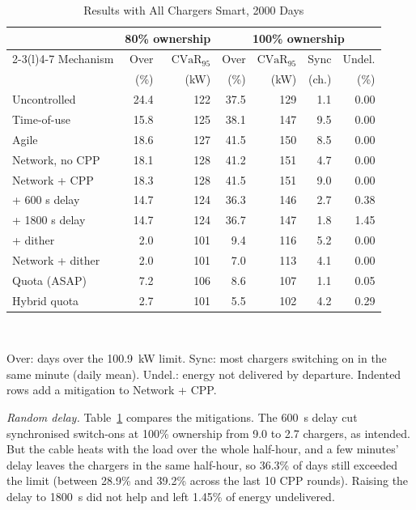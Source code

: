 \documentclass[conference]{IEEEtran}
\newcommand{\CVaR}{\mathrm{CVaR}}
\begin{document}
\begin{table}[t]
\caption{Results with All Chargers Smart, 2000 Days}
\label{tab:main}
\centering
\footnotesize
\setlength{\tabcolsep}{2.4pt}
\begin{tabular}{@{}lrrrrrr@{}}
\toprule
 & \multicolumn{2}{c}{80\% ownership} & \multicolumn{4}{c}{100\% ownership}\\
\cmidrule(lr){2-3}\cmidrule(l){4-7}
Mechanism & Over & $\CVaR_{95}$ & Over & $\CVaR_{95}$ & Sync & Undel.\\
 & (\%) & (kW) & (\%) & (kW) & (ch.) & (\%)\\
\midrule
Uncontrolled & 24.4 & 122 & 37.5 & 129 & 1.1 & 0.00\\
Time-of-use & 15.8 & 125 & 38.1 & 147 & 9.5 & 0.00\\
Agile & 18.6 & 127 & 41.5 & 150 & 8.5 & 0.00\\
Network, no CPP & 18.1 & 128 & 41.2 & 151 & 4.7 & 0.00\\
Network + CPP & 18.3 & 128 & 41.5 & 151 & 9.0 & 0.00\\
\quad + 600 s delay & 14.7 & 124 & 36.3 & 146 & 2.7 & 0.38\\
\quad + 1800 s delay & 14.7 & 124 & 36.7 & 147 & 1.8 & 1.45\\
\quad + dither & 2.0 & 101 & 9.4 & 116 & 5.2 & 0.00\\
Network + dither & 2.0 & 101 & 7.0 & 113 & 4.1 & 0.00\\
Quota (ASAP) & 7.2 & 106 & 8.6 & 107 & 1.1 & 0.05\\
Hybrid quota & 2.7 & 101 & 5.5 & 102 & 4.2 & 0.29\\
\bottomrule
\end{tabular}\\[2pt]
\begin{minipage}{\columnwidth}\footnotesize
Over: days over the 100.9~kW limit. Sync: most chargers switching on in the
same minute (daily mean). Undel.: energy not delivered by departure. Indented
rows add a mitigation to Network + CPP.
\end{minipage}
\end{table}

\emph{Random delay.} Table~\ref{tab:main} compares the mitigations. The
600~s delay cut synchronised switch-ons at 100\%
ownership from 9.0 to 2.7 chargers, as intended. But the cable heats with the
load over the whole half-hour, and a few minutes' delay leaves the chargers
in the same half-hour, so 36.3\% of days still exceeded the limit (between
28.9\% and 39.2\% across the last 10 CPP rounds). Raising the delay to
1800~s did not help and left 1.45\% of energy undelivered.
\end{document}
